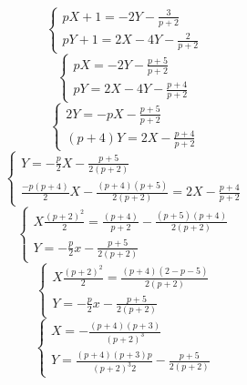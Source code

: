 \documentclass{article}
\begin{document}
    \begin{equation*}
    \begin{cases}
        pX + 1 = -2Y - \frac{3}{p+2}\\
        pY + 1 = 2X - 4Y - \frac{2}{p+2}      
    \end{cases}
    \end{equation*}
    \begin{equation*}
    \begin{cases}
        pX = -2Y - \frac{p+5}{p+2}\\
        pY = 2X -4Y - \frac{p+4}{p+2}     
    \end{cases}
    \end{equation*}
    \begin{equation*}
    \begin{cases}
        2Y = -pX -\frac{p+5}{p+2}\\
        (p+4)Y = 2X - \frac{p+4}{p+2}    
    \end{cases}
    \end{equation*}
    \begin{equation*}
    \begin{cases}
        Y = -\frac{p}{2}X - \frac{p+5}{2(p+2)} \\
        \frac{-p(p+4)}{2}X - \frac{(p+4)(p+5)}{2(p+2)} = 2X - \frac{p+4}{p+2}
    \end{cases}
    \end{equation*}
     \begin{equation*}
    \begin{cases}
        X\frac{(p+2)^2}{2} = \frac{(p+4)}{p+2} -\frac{(p+5)(p+4)}{2(p+2)}\\
        Y = -\frac{p}{2}x - \frac{p+5}{2(p+2)}
    \end{cases}
    \end{equation*}
    \begin{equation*}
    \begin{cases}
        X\frac{(p+2)^2}{2} = \frac{(p+4)(2-p-5)}{2(p+2)}\\
        Y = -\frac{p}{2}x - \frac{p+5}{2(p+2)}
    \end{cases}
    \end{equation*}
     \begin{equation*}
    \begin{cases}
        X = -\frac{(p+4)(p+3)}{(p+2)^3}\\
        Y = \frac{(p+4)(p+3)p}{(p+2)^3 2} - \frac{p+5}{2(p+2)}
    \end{cases}
    \end{equation*}
\end{document}
